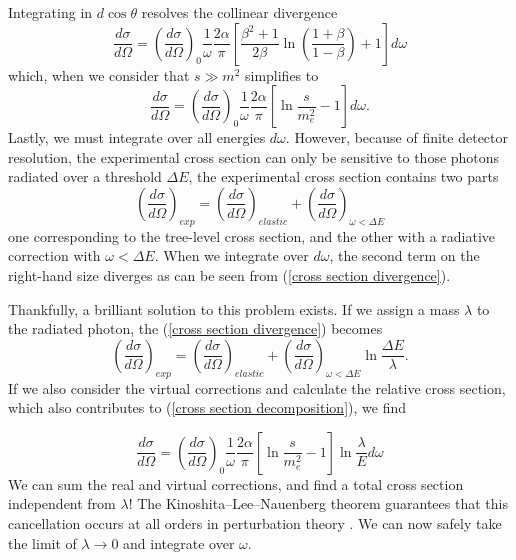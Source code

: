 \documentclass[10pt,a4paper]{book}
\begin{document}
Integrating in $d\cos\theta$ resolves the collinear divergence
\begin{equation}
\frac{d\sigma}{d\Omega} = \left(\frac{d\sigma}{d\Omega}\right)_0 \frac{1}{\omega} \frac{2\alpha}{\pi}\left[\frac{\beta^2 +1}{2\beta} \ln \left( \frac{1 + \beta}{1 - \beta}\right) +1 \right]d\omega
\end{equation}
which, when we consider that $s \gg m^2$ simplifies to
\begin{equation}
\frac{d\sigma}{d\Omega} = \left(\frac{d\sigma}{d\Omega}\right)_0 \frac{1}{\omega} \frac{2\alpha}{\pi}\left[\ln\frac{s}{m_e^2} - 1 \right] d\omega.
\label{cross section divergence}
\end{equation}
Lastly, we must integrate over all energies $d\omega$. However, because of finite detector resolution, the experimental cross section can only be sensitive to those photons radiated over a threshold $\Delta E$, the experimental cross section contains two parts
\begin{equation}
\left( \frac{d\sigma}{d\Omega}\right)_{exp} = \left( \frac{d\sigma}{d\Omega}\right)_{elastic} + \left( \frac{d\sigma}{d\Omega}\right)_{\omega < \Delta E}
\label{cross section decomposition}
\end{equation}
one corresponding to the tree-level cross section, and the other with a radiative correction with $\omega < \Delta E$. When we integrate over $d\omega$, the second term on the right-hand size diverges as can be seen from (\ref{cross section divergence}).

Thankfully, a brilliant solution to this problem exists. If we assign a mass $\lambda$ to the radiated photon, the (\ref{cross section divergence}) becomes
\begin{equation}
\left( \frac{d\sigma}{d\Omega}\right)_{exp} = \left( \frac{d\sigma}{d\Omega}\right)_{elastic} + \left( \frac{d\sigma}{d\Omega}\right)_{\omega < \Delta E}\ln \frac{\Delta E}{\lambda}.
\end{equation}
If we also consider the virtual corrections and calculate the relative cross section, which also contributes to (\ref{cross section decomposition}), we find

\begin{equation}
\frac{d\sigma}{d\Omega} = \left(\frac{d\sigma}{d\Omega}\right)_0 \frac{1}{\omega} \frac{2\alpha}{\pi}\left[\ln\frac{s}{m_e^2} - 1 \right] \ln \frac{\lambda}{E} d\omega
\end{equation}
We can sum the real and virtual corrections, and find a total cross section independent from $\lambda$! The Kinoshita–Lee–Nauenberg theorem guarantees that this cancellation occurs at all orders in perturbation theory \cite{Kinoshita:1962ur}. We can now safely take the limit of $\lambda \rightarrow 0$ and integrate over $\omega$.
\end{document}
